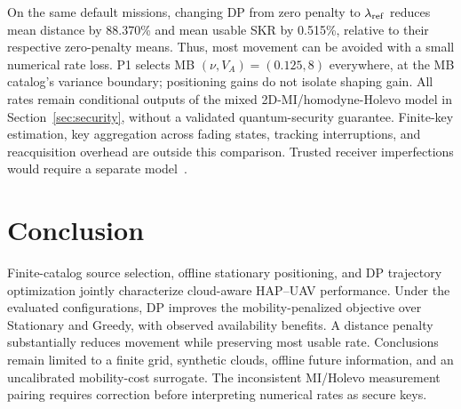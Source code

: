 On the same default missions, changing DP from zero penalty to
$\lambda_{\rm ref}$ reduces mean distance by 88.370\% and mean usable
SKR by 0.515\%, relative to their respective zero-penalty means. Thus,
most movement can be avoided with a small numerical rate loss. P1
selects MB $(\nu,V_A)=(0.125,8)$ everywhere, at the MB catalog's variance
boundary; positioning gains do not isolate shaping gain. All rates remain
conditional outputs of the mixed 2D-MI/homodyne-Holevo model in
Section~\ref{sec:security}, without a validated quantum-security guarantee.
Finite-key estimation, key aggregation across fading states, tracking
interruptions, and reacquisition overhead are outside this comparison.
Trusted receiver imperfections would require a separate
model~\cite{usenko2016}.

\section{Conclusion}
\label{sec:conclusion}
Finite-catalog source selection, offline stationary positioning, and DP
trajectory optimization jointly characterize cloud-aware HAP--UAV
performance. Under the evaluated configurations, DP improves the
mobility-penalized objective over Stationary and Greedy, with observed
availability benefits. A distance penalty substantially reduces movement
while preserving most usable rate. Conclusions remain limited to a finite
grid, synthetic clouds, offline future information, and an uncalibrated
mobility-cost surrogate. The inconsistent MI/Holevo measurement pairing
requires correction before interpreting numerical rates as secure keys.
